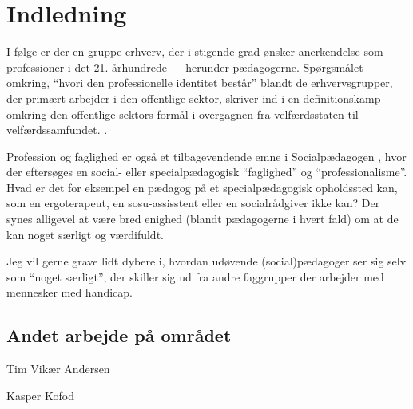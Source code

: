 \section{Indledning}

I følge \citeauthor{hansbolKonstruktionAfProfessionel2008} er der en gruppe erhverv, der i stigende grad ønsker anerkendelse som professioner i det 21. århundrede — herunder pædagogerne.
Spørgsmålet omkring, “hvori den professionelle identitet består” blandt de erhvervsgrupper, der primært arbejder i den offentlige sektor, skriver \citeauthor{hansbolKonstruktionAfProfessionel2008} ind i en definitionskamp omkring den offentlige sektors formål i overgagnen fra velfærdsstaten til velfærdssamfundet.
\autocite[s. 19]{hansbolKonstruktionAfProfessionel2008}.

Profession og faglighed er også et tilbagevendende emne i Socialpædagogen \autocite[fx]{petersenHvadSigerEksperten2019}, hvor der eftersøges en social- eller specialpædagogisk “faglighed” og “professionalisme”.
Hvad er det for eksempel en pædagog på et specialpædagogisk opholdssted kan, som en ergoterapeut, en sosu-assisstent eller en socialrådgiver ikke kan? Der synes alligevel at være bred enighed (blandt pædagogerne i hvert fald) om at de kan noget særligt og værdifuldt.

Jeg vil gerne grave lidt dybere i, hvordan udøvende (social)pædagoger ser sig selv som “noget særligt”, der skiller sig ud fra andre faggrupper der arbejder med mennesker med handicap.

\subsection{Andet arbejde på området}

Tim Vikær Andersen

Kasper Kofod

